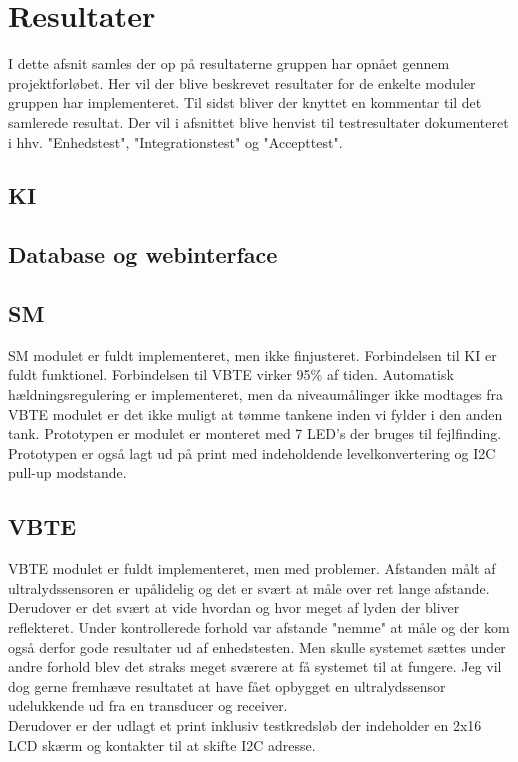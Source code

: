 \section{Resultater}
I dette afsnit samles der op på resultaterne gruppen har opnået gennem projektforløbet. Her vil der blive beskrevet resultater for de enkelte moduler gruppen har implementeret. Til sidst bliver der knyttet en kommentar til det samlerede resultat. Der vil i afsnittet blive henvist til testresultater dokumenteret i hhv. "Enhedstest", "Integrationstest" og "Accepttest".

\subsection{KI}

\subsection{Database og webinterface}

\subsection{SM}
SM modulet er fuldt implementeret, men ikke finjusteret. Forbindelsen til KI er fuldt funktionel. Forbindelsen til VBTE virker 95\% af tiden. Automatisk hældningsregulering er implementeret, men da niveaumålinger ikke modtages fra VBTE modulet er det ikke muligt at tømme tankene inden vi fylder i den anden tank. Prototypen er modulet er monteret med 7 LED's der bruges til fejlfinding. Prototypen er også lagt ud på print med indeholdende levelkonvertering og I2C pull-up modstande.

\subsection{VBTE}
VBTE modulet er fuldt implementeret, men med problemer. Afstanden målt af ultralydssensoren er upålidelig og det er svært at måle over ret lange afstande. Derudover er det svært at vide hvordan og hvor meget af lyden der bliver reflekteret. Under kontrollerede forhold var afstande "nemme" at måle og der kom også derfor gode resultater ud af enhedstesten. Men skulle systemet sættes under andre forhold blev det straks meget sværere at få systemet til at fungere. Jeg vil dog gerne fremhæve resultatet at have fået opbygget en ultralydssensor udelukkende ud fra en transducer og receiver.\\ Derudover er der udlagt et print inklusiv testkredsløb der indeholder en 2x16 LCD skærm og kontakter til at skifte I2C adresse.

